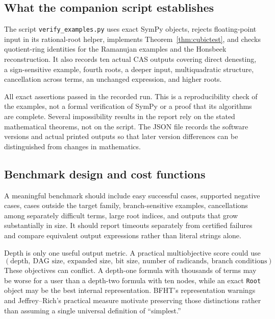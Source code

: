 \documentclass[11pt,a4paper]{article}
\theoremstyle{definition}
\theoremstyle{remark}
\numberwithin{equation}{section}
\begin{document}
\subsection{What the companion script establishes}

The script \texttt{verify\_examples.py} uses exact SymPy objects, rejects floating-point input in its rational-root helper, implements Theorem~\ref{thm:cubictest}, and checks quotient-ring identities for the Ramanujan examples and the Honsbeek reconstruction. It also records ten actual CAS outputs covering direct denesting, a sign-sensitive example, fourth roots, a deeper input, multiquadratic structure, cancellation across terms, an unchanged expression, and higher roots.

All exact assertions passed in the recorded run. This is a reproducibility check of the examples, not a formal verification of SymPy or a proof that its algorithms are complete. Several impossibility results in the report rely on the stated mathematical theorems, not on the script. The JSON file records the software versions and actual printed outputs so that later version differences can be distinguished from changes in mathematics.

\subsection{Benchmark design and cost functions}

A meaningful benchmark should include easy successful cases, supported negative cases, cases outside the target family, branch-sensitive examples, cancellations among separately difficult terms, large root indices, and outputs that grow substantially in size. It should report timeouts separately from certified failures and compare equivalent output expressions rather than literal strings alone.

Depth is only one useful output metric. A practical multiobjective score could use
\[
 (\text{depth},\ \text{DAG size},\ \text{expanded size},\
   \text{bit size},\ \text{number of radicands},\
   \text{branch conditions}).
\]
These objectives can conflict. A depth-one formula with thousands of terms may be worse for a user than a depth-two formula with ten nodes, while an exact \texttt{Root} object may be the best internal representation. BFHT's representation warnings and Jeffrey--Rich's practical measure motivate preserving those distinctions rather than assuming a single universal definition of ``simplest.''\cite{bfht,jeffreyrich}
\end{document}
